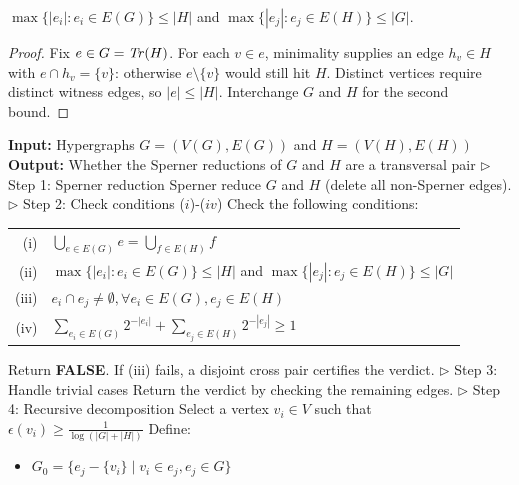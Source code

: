 \begin{proposition}\label{prop:size}
$\max\{|e_i|:e_i\in E(G)\}\leq|H|$ and $\max\{|e_j|:e_j\in E(H)\}\leq|G|$.
\end{proposition}

\begin{proof}
Fix $e\in G=\mathit{Tr}(H)$. For each $v\in e$, minimality supplies an
edge $h_v\in H$ with $e\cap h_v=\{v\}$: otherwise $e\setminus\{v\}$ would
still hit $H$. Distinct vertices require distinct witness edges, so
$|e|\leq |H|$. Interchange $G$ and $H$ for the second bound.
\end{proof}

\begin{algorithm}[p]
\caption{Algorithm \FKA{} for \TransHyp{} (cf. \cite{FK96})}\label{alg:fka}
\begin{algorithmic}[1]
\State \textbf{Input:} Hypergraphs $G=(V(G),E(G))$ and $H=(V(H),E(H))$
\State \textbf{Output:} Whether the Sperner reductions of $G$ and $H$ are a transversal pair
\Statex \hfill$\triangleright$ Step 1: Sperner reduction
\State Sperner reduce $G$ and $H$ (delete all non-Sperner edges).
\Statex \hfill$\triangleright$ Step 2: Check conditions ($i$)-($iv$)
\State Check the following conditions:
\Statex \hspace{\algorithmicindent}\begin{tabular}{rl}
(i) & $\bigcup_{e\in E(G)}e=\bigcup_{f\in E(H)}f$\\
(ii) & $\max\{|e_i|:e_i\in E(G)\}\leq|H|$ and $\max\{|e_j|:e_j\in E(H)\}\leq|G|$\\
(iii) & $e_i\cap e_j\neq\emptyset,\forall e_i\in E(G),e_j\in E(H)$\\
(iv) & $\sum_{e_i\in E(G)}2^{-|e_i|}+\sum_{e_j\in E(H)}2^{-|e_j|}\geq 1$
\end{tabular}
\State Return \textbf{FALSE}. If (iii) fails, a disjoint cross pair certifies the verdict.
\EndIf
\Statex \hfill$\triangleright$ Step 3: Handle trivial cases
\State Return the verdict by checking the remaining edges.
\EndIf
\Statex \hfill$\triangleright$ Step 4: Recursive decomposition
\State Select a vertex $v_i\in V$ such that $\epsilon(v_i)\geq\frac{1}{\log(|G|+|H|)}$
\State Define:
\Statex \hspace{\algorithmicindent}\begin{minipage}{0.8\linewidth}
\begin{itemize}
\item $G_0=\{e_j-\{v_i\}\mid v_i\in e_j,e_j\in G\}$

\end{itemize}
\end{minipage}
\end{algorithmic}
\end{algorithm}

